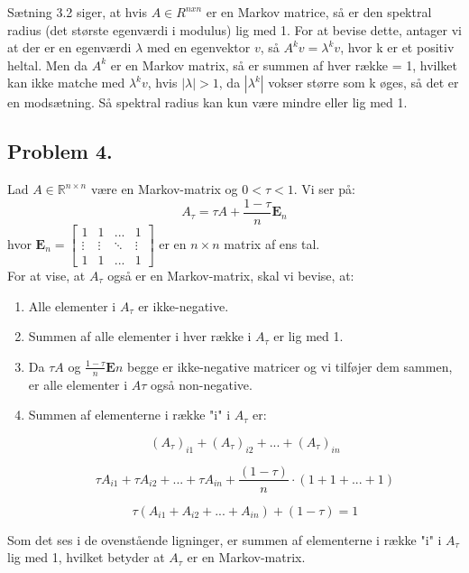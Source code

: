 Sætning 3.2 siger, at hvis $A \in R^{nxn}$ er en Markov matrice, så er den spektral radius (det største egenværdi i modulus) lig med 1. For at bevise dette, antager vi at der er en egenværdi $\lambda$ med en egenvektor $v$, så $A^kv = \lambda^kv$, hvor k er et positiv heltal. Men da $A^k$ er en Markov matrix, så er summen af hver række = 1, hvilket kan ikke matche med $\lambda^kv$, hvis $|\lambda| > 1$, da $|\lambda^k|$ vokser større som k øges, så det er en modsætning. Så spektral radius kan kun være mindre eller lig med 1.

\subsection*{Problem 4.}

Lad $A \in \mathbb{R}^{n \times n}$ være en Markov-matrix og $0 < \tau < 1$. Vi ser på: 
$$A_\tau = \tau A + \frac{1-\tau}{n} \mathbf{E}_n$$
hvor $\mathbf{E}_n = \begin{bmatrix} 1 & 1 & ... & 1\\ \vdots & \vdots & \ddots & \vdots\\ 1 & 1 & ... & 1 \end{bmatrix}$ er en $n \times n$ matrix af ens tal.\\

For at vise, at $A_\tau$ også er en Markov-matrix, skal vi bevise, at:
\begin{enumerate}
    \item Alle elementer i $A_\tau$ er ikke-negative.
    \item Summen af alle elementer i hver række i $A_\tau$ er lig med 1.
    \item Da $\tau A$ og $\frac{1-\tau}{n} \mathbf{E}n$ begge er ikke-negative matricer og vi tilføjer dem sammen, er alle elementer i $A\tau$ også non-negative.
    \item Summen af elementerne i række "i" i $A_\tau$ er:
    
    $$(A_\tau)_{i1} + (A_\tau)_{i2} + ... + (A_\tau)_{in}$$ 

$$\tau A_{i1} + \tau A_{i2} + ... + \tau A_{in} + \frac{(1 - \tau)}{n}\cdot (1+1+...+1)$$

$$\tau(A_{i1} + A_{i2} + ... + A_{in}) + (1 - \tau) = 1$$

\end{enumerate}


Som det ses i de ovenstående ligninger, er summen af elementerne i række "i" i $A_\tau$ lig med 1, hvilket betyder at $A_\tau$ er en Markov-matrix.

